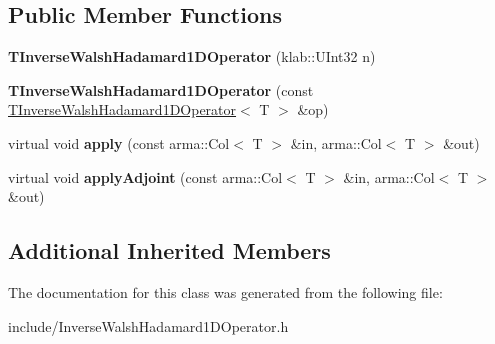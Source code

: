 \subsection*{Public Member Functions}
\begin{DoxyCompactItemize}
\item 
{\bfseries T\+Inverse\+Walsh\+Hadamard1\+D\+Operator} (klab\+::\+U\+Int32 n)\hypertarget{classkl1p_1_1TInverseWalshHadamard1DOperator_ad2afba6cabfb7729173e4b5e0fb673c3}{}\label{classkl1p_1_1TInverseWalshHadamard1DOperator_ad2afba6cabfb7729173e4b5e0fb673c3}

\item 
{\bfseries T\+Inverse\+Walsh\+Hadamard1\+D\+Operator} (const \hyperlink{classkl1p_1_1TInverseWalshHadamard1DOperator}{T\+Inverse\+Walsh\+Hadamard1\+D\+Operator}$<$ T $>$ \&op)\hypertarget{classkl1p_1_1TInverseWalshHadamard1DOperator_a4be3b4d4e9cde2a719a83931c68f7d15}{}\label{classkl1p_1_1TInverseWalshHadamard1DOperator_a4be3b4d4e9cde2a719a83931c68f7d15}

\item 
virtual void {\bfseries apply} (const arma\+::\+Col$<$ T $>$ \&in, arma\+::\+Col$<$ T $>$ \&out)\hypertarget{classkl1p_1_1TInverseWalshHadamard1DOperator_ad7e223bc960eb74b655dadefcd5c0303}{}\label{classkl1p_1_1TInverseWalshHadamard1DOperator_ad7e223bc960eb74b655dadefcd5c0303}

\item 
virtual void {\bfseries apply\+Adjoint} (const arma\+::\+Col$<$ T $>$ \&in, arma\+::\+Col$<$ T $>$ \&out)\hypertarget{classkl1p_1_1TInverseWalshHadamard1DOperator_a889043f3ee68ce71a70e7050bf86657c}{}\label{classkl1p_1_1TInverseWalshHadamard1DOperator_a889043f3ee68ce71a70e7050bf86657c}

\end{DoxyCompactItemize}
\subsection*{Additional Inherited Members}


The documentation for this class was generated from the following file\+:\begin{DoxyCompactItemize}
\item 
include/Inverse\+Walsh\+Hadamard1\+D\+Operator.\+h\end{DoxyCompactItemize}
